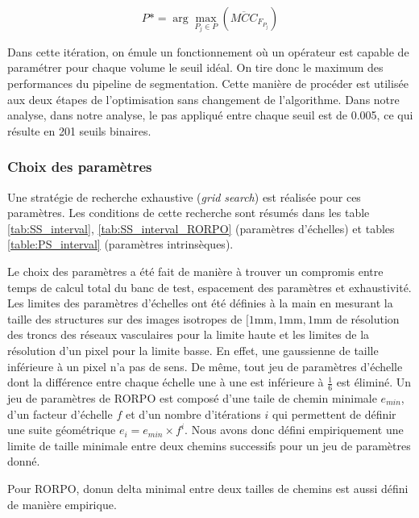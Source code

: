   \begin{equation}
    P* =  \arg\max_ {P_j \in P}( \overline{MCC}_{ F_{P_j} } )
  \end{equation}


  Dans cette itération, on émule un fonctionnement où un opérateur est capable de paramétrer pour chaque volume le seuil idéal. On tire donc le maximum des performances du pipeline de segmentation. Cette manière de procéder est utilisée aux deux étapes de l'optimisation sans changement de l'algorithme. Dans notre analyse, dans notre analyse, le pas appliqué entre chaque seuil est de 0.005, ce qui résulte en 201 seuils binaires.

  \subsubsection{Choix des paramètres}

Une stratégie de recherche exhaustive (\textit{grid search}) est réalisée pour ces paramètres. Les conditions de cette recherche sont résumés dans les table \ref{tab:SS_interval}, \ref{tab:SS_interval_RORPO} (paramètres d'échelles) et tables \ref{table:PS_interval} (paramètres intrinsèques).

Le choix des paramètres a été fait de manière à trouver un compromis entre temps de calcul total du banc de test, espacement des paramètres et exhaustivité. Les limites des paramètres d'échelles ont été définies à la main en mesurant la taille des structures sur des images isotropes de $[1\textrm{mm},1\textrm{mm},1\textrm{mm}$ de résolution des troncs des réseaux vasculaires pour la limite haute et les limites de la résolution d'un pixel pour la limite basse. En effet, une gaussienne de taille inférieure à un pixel n'a pas de sens. De même, tout jeu de paramètres d'échelle dont la différence entre chaque échelle une à une est inférieure à $\frac{1}{6}$ est éliminé. Un jeu de paramètres de RORPO est composé d'une taile de chemin minimale $e_{min}$, d'un facteur d'échelle $f$ et d'un nombre d'itérations $i$ qui permettent de définir une suite géométrique $e_i = e_{min} \times f^i$. Nous avons donc défini empiriquement une limite de taille minimale entre deux chemins successifs pour un jeu de paramètres donné.

Pour RORPO, donun delta minimal entre deux tailles de chemins est aussi défini de manière empirique.

